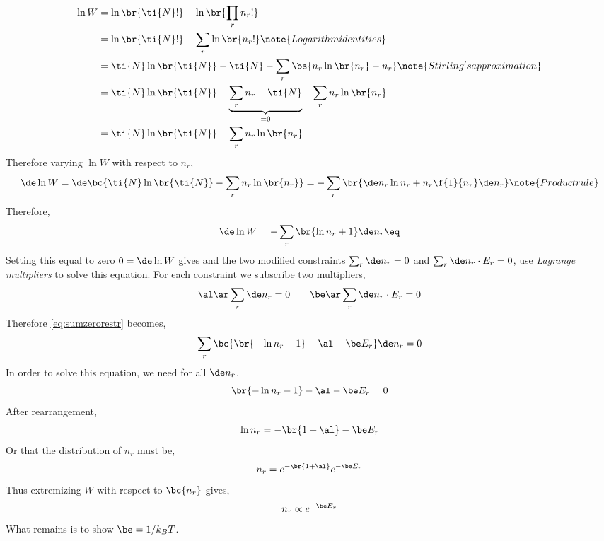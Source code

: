 \documentclass{article}
\begin{document}
\begin{align*}
    \ln W &= \ln\br{\ti{N}!} - \ln\br{\prod_{r}n_r!} \\
    &= \ln\br{\ti{N}!} - \sum_{r}\ln\br{n_r!} \note{Logarithm identities} \\
    &= \ti{N}\ln\br{\ti{N}} - \ti{N} - \sum_{r}\bs{n_r\ln\br{n_r} - n_r} \note{Stirling's approximation}\\
    &= \ti{N}\ln\br{\ti{N}} + \underbrace{\sum_{r} n_r - \ti{N}}_{=0} - \sum_{r}n_r\ln\br{n_r} \\
    &= \ti{N}\ln\br{\ti{N}} - \sum_{r}n_r\ln\br{n_r}
\end{align*}
Therefore varying $\ln W$ with respect to $n_r$,
\[ \de\ln W = \de\bc{\ti{N}\ln\br{\ti{N}} - \sum_{r}n_r\ln\br{n_r}} = -\sum_{r}\br{\de n_r \ln n_r + n_r \f{1}{n_r} \de n_r} \note{Product rule}\]
Therefore,
\[ \de\ln W = -\sum_{r}\br{\ln n_r + 1}\de n_r \eq \label{eq:sumzerorestr}\]
Setting this equal to zero $0 = \de \ln W$ gives and the two modified constraints $\sum_r \de n_r = 0$ and $\sum_r \de n_r \cdot E_r = 0$, use \textit{Lagrange multipliers} to solve this equation. For each constraint we subscribe two multipliers,
\[ \al \ar \sum_r \de n_r = 0 \qquad \be \ar \sum_r \de n_r \cdot E_r= 0 \]
Therefore \ref{eq:sumzerorestr} becomes,
\[ \sum_r \bc{\br{-\ln n_r - 1} - \al - \be E_r} \de n_r = 0 \]
In order to solve this equation, we need for all $\de n_r$,
\[ \br{-\ln n_r - 1} - \al - \be E_r = 0 \]
After rearrangement,
\[ \ln n_r = -\br{1+\al} - \be E_r \]
Or that the distribution of $n_r$ must be,
\[ n_r = e^{-\br{1+\al}}e^{-\be E_r} \]
Thus extremizing $W$ with respect to $\bc{n_r}$ gives,
\[ n_r \propto e^{-\be E_r} \]
What remains is to show $\be = 1/k_B T$.
\end{document}
